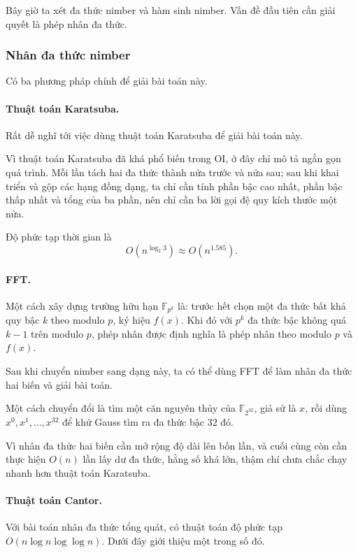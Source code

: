 \documentclass[11pt]{article}
\begin{document}
Bây giờ ta xét đa thức nimber và hàm sinh nimber. Vấn đề đầu tiên cần giải
quyết là phép nhân đa thức.

\subsubsection{Nhân đa thức nimber}

Có ba phương pháp chính để giải bài toán này.

\paragraph{Thuật toán Karatsuba.}
Rất dễ nghĩ tới việc dùng thuật toán Karatsuba để giải bài toán này.

Vì thuật toán Karatsuba đã khá phổ biến trong OI, ở đây chỉ mô tả ngắn gọn quá
trình. Mỗi lần tách hai đa thức thành nửa trước và nửa sau; sau khi khai triển
và gộp các hạng đồng dạng, ta chỉ cần tính phần bậc cao nhất, phần bậc thấp
nhất và tổng của ba phần, nên chỉ cần ba lời gọi đệ quy kích thước một nửa.

Độ phức tạp thời gian là
\[
  O(n^{\log_2 3})\approx O(n^{1.585}).
\]

\paragraph{FFT.}
Một cách xây dựng trường hữu hạn \(\mathbb{F}_{p^k}\) là: trước hết chọn một đa
thức bất khả quy bậc \(k\) theo modulo \(p\), ký hiệu \(f(x)\). Khi đó với
\(p^k\) đa thức bậc không quá \(k-1\) trên modulo \(p\), phép nhân được định
nghĩa là phép nhân theo modulo \(p\) và \(f(x)\).

Sau khi chuyển nimber sang dạng này, ta có thể dùng FFT để làm nhân đa thức hai
biến và giải bài toán.

Một cách chuyển đổi là tìm một căn nguyên thủy của \(\mathbb{F}_{2^{32}}\), giả
sử là \(x\), rồi dùng \(x^0,x^1,\ldots,x^{32}\) để khử Gauss tìm ra đa thức bậc
\(32\) đó.

Vì nhân đa thức hai biến cần mở rộng độ dài lên bốn lần, và cuối cùng còn cần
thực hiện \(O(n)\) lần lấy dư đa thức, hằng số khá lớn, thậm chí chưa chắc chạy
nhanh hơn thuật toán Karatsuba.

\paragraph{Thuật toán Cantor.}
Với bài toán nhân đa thức tổng quát, có thuật toán độ phức tạp
\(O(n\log n\log\log n)\). Dưới đây giới thiệu một trong số đó.
\end{document}
